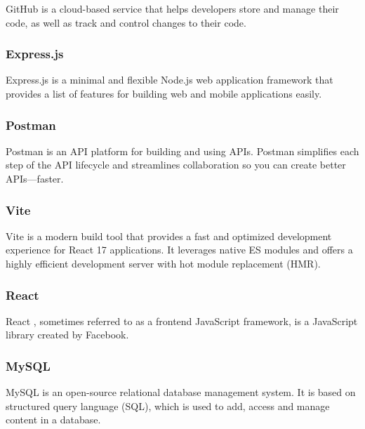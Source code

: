 GitHub \cite{GithubWebsite} is a cloud-based service that helps developers store and manage their code, as well as track and control changes to their code.

\subsubsection*{\protect{} Express.js}

Express.js \cite{ExpressJSWebsite} is a minimal and flexible Node.js \cite{NodeJSWebsite} web application framework that provides a list of features for building web and mobile applications easily.

\subsubsection*{\protect{} Postman}

Postman \cite{PostmanWebsite} is an API platform for building and using APIs. Postman simplifies each step of the API lifecycle and streamlines collaboration so you can create better APIs—faster.

\subsubsection*{\protect{} Vite}

Vite \cite{ViteJSWebsite} is a modern build tool that provides a fast and optimized development experience for React 17 applications. It leverages native ES modules and offers a highly efficient development server with hot module replacement (HMR).

\subsubsection*{\protect{} React}

React \cite{ReactWebsite}, sometimes referred to as a frontend JavaScript framework, is a JavaScript library created by Facebook.

\subsubsection*{\protect{} MySQL}

MySQL \cite{MySQLWebsite} is an open-source relational database management system. It is based on structured query language (SQL), which is used to add, access and manage content in a database.

